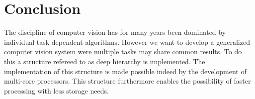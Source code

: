 \section{Conclusion}
\label{sec:conclusion}
The discipline of computer vision has for many years been dominated by individual task dependent algorithms. However we want to develop a generalized computer vision system were multiple tasks may share common results. To do this a structure refereed to as deep hierarchy is implemented. The implementation of this structure is made possible indeed by the development of multi-core processors. This structure furthermore enables the possibility of faster processing with less storage needs.
